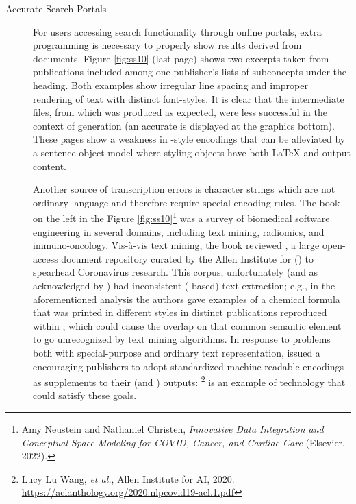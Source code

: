 \documentclass[11pt]{article}
\begin{document}
{{\begin{description}
\item[Accurate Search Portals]  For users accessing search functionality 
through online \HTML{} portals, extra programming is necessary to 
properly show results derived from \PDF{} documents.  Figure \ref{fig:ss10} 
(last page)  
shows two excerpts taken from publications included among 
one publisher's lists of subconcepts under the  heading.  
Both examples show irregular line spacing and improper rendering 
of text with distinct font-styles.  It is clear that the 
intermediate files, from which \PDF{} was produced as expected, 
were less successful in the context of \HTML{} generation 
(an accurate \PDF{} is displayed at the graphics bottom).  
These pages show a weakness in \JATS{}-style encodings 
that can be alleviated by a sentence-object model where 
styling objects have both \LaTeX{} and \HTML{} output content.     

\pseudoIndent{} Another source of transcription errors is 
character strings which are not ordinary language and therefore 
require special encoding rules.  The book on the 
left in the Figure \ref{fig:ss10}\footnote{\hspace*{4pt}Amy Neustein 
and Nathaniel Christen, \textit{Innovative Data Integration and Conceptual Space Modeling for COVID, Cancer, and Cardiac Care} 
(Elsevier, 2022).} was a survey of biomedical software engineering in
several domains, including text mining, radiomics, and immuno-oncology.  
Vis-\`a-vis text mining, the book reviewed \CORDNineteen{}, a 
large open-access document repository curated by the Allen Institute 
for \AI{} (\AItwo{}) to spearhead Coronavirus research.  This corpus, unfortunately 
(and as acknowledged by \AItwo{}) had inconsistent (\PDF{}-based) text 
extraction; e.g., in the aforementioned analysis the authors gave examples of a 
chemical formula that was printed in different styles in distinct 
publications reproduced within \CORDNineteen{}, which could cause the 
overlap on that common semantic element to go unrecognized by 
text mining algorithms.  In response to problems both with 
special-purpose and ordinary text representation, \AItwo{} issued a 
 encouraging publishers to adopt standardized 
machine-readable encodings as supplements to their \PDF{} (and 
\HTML{}) outputs: \footnote{\hspace*{5pt}Lucy Lu Wang, \textit{et al.}, 
 Allen Institute for AI, 2020. 
\href{https://aclanthology.org/2020.nlpcovid19-acl.1.pdf}{https://aclanthology.org/2020.nlpcovid19-acl.1.pdf}}  \lPacTk{} is an example of technology 
that could satisfy these goals. 


\end{description}}}
\end{document}
